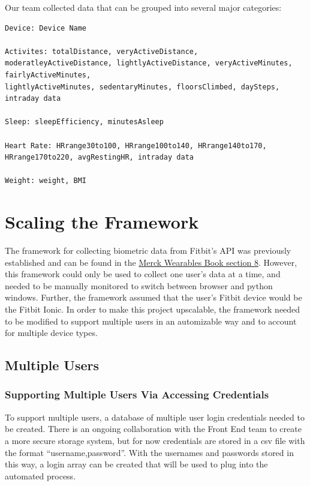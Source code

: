 \documentclass[]{book}
\begin{document}
Our team collected data that can be grouped into several major
categories:

\begin{verbatim}
Device: Device Name

Activites: totalDistance, veryActiveDistance, moderatleyActiveDistance, lightlyActiveDistance, veryActiveMinutes, fairlyActiveMinutes, 
lightlyActiveMinutes, sedentaryMinutes, floorsClimbed, daySteps, intraday data

Sleep: sleepEfficiency, minutesAsleep

Heart Rate: HRrange30to100, HRrange100to140, HRrange140to170, HRrange170to220, avgRestingHR, intraday data

Weight: weight, BMI
\end{verbatim}

\section{Scaling the Framework}\label{scaling-the-framework}

The framework for collecting biometric data from Fitbit's API was
previously established and can be found in the
\href{https://nicholasrosenorn.github.io/wearables-book/tutorial-data-capture-in-python.html\#authentication}{Merck
Wearables Book section 8}. However, this framework could only be used to
collect one user's data at a time, and needed to be manually monitored
to switch between browser and python windows. Further, the framework
assumed that the user's Fitbit device would be the Fitbit Ionic. In
order to make this project upscalable, the framework needed to be
modified to support multiple users in an automizable way and to account
for multiple device types.

\subsection{Multiple Users}\label{multiple-users}

\subsubsection{Supporting Multiple Users Via Accessing
Credentials}\label{supporting-multiple-users-via-accessing-credentials}

To support multiple users, a database of multiple user login credentials
needed to be created. There is an ongoing collaboration with the Front
End team to create a more secure storage system, but for now credentials
are stored in a csv file with the format ``username,password''. With the
usernames and passwords stored in this way, a login array can be created
that will be used to plug into the automated process.
\end{document}
